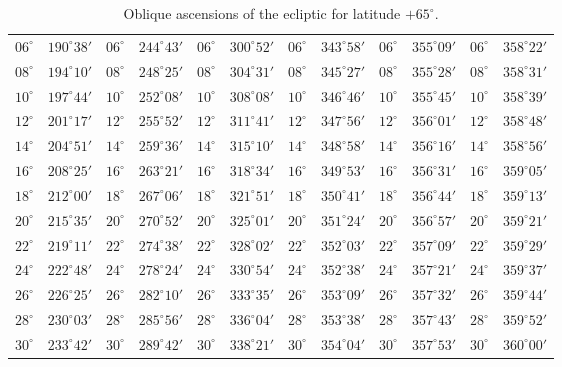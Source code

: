 \begin{table}[!h]
{\begin{tabular}{cc|cc|cc|cc|cc|cc}
$06^\circ$ & $190^\circ38'$ & $06^\circ$ & $244^\circ43'$ & $06^\circ$ & $300^\circ52'$ & $06^\circ$ & $343^\circ58'$ &  $06^\circ$ & $355^\circ09'$ & $06^\circ$ & $358^\circ22'$\\
$08^\circ$ & $194^\circ10'$ & $08^\circ$ & $248^\circ25'$ & $08^\circ$ & $304^\circ31'$ & $08^\circ$ & $345^\circ27'$ &  $08^\circ$ & $355^\circ28'$ & $08^\circ$ & $358^\circ31'$\\
$10^\circ$ & $197^\circ44'$ & $10^\circ$ & $252^\circ08'$ & $10^\circ$ & $308^\circ08'$ & $10^\circ$ & $346^\circ46'$ &  $10^\circ$ & $355^\circ45'$ & $10^\circ$ & $358^\circ39'$\\
$12^\circ$ & $201^\circ17'$ & $12^\circ$ & $255^\circ52'$ & $12^\circ$ & $311^\circ41'$ & $12^\circ$ & $347^\circ56'$ &  $12^\circ$ & $356^\circ01'$ & $12^\circ$ & $358^\circ48'$\\
$14^\circ$ & $204^\circ51'$ & $14^\circ$ & $259^\circ36'$ & $14^\circ$ & $315^\circ10'$ & $14^\circ$ & $348^\circ58'$ &  $14^\circ$ & $356^\circ16'$ & $14^\circ$ & $358^\circ56'$\\
$16^\circ$ & $208^\circ25'$ & $16^\circ$ & $263^\circ21'$ & $16^\circ$ & $318^\circ34'$ & $16^\circ$ & $349^\circ53'$ &  $16^\circ$ & $356^\circ31'$ & $16^\circ$ & $359^\circ05'$\\
$18^\circ$ & $212^\circ00'$ & $18^\circ$ & $267^\circ06'$ & $18^\circ$ & $321^\circ51'$ & $18^\circ$ & $350^\circ41'$ &  $18^\circ$ & $356^\circ44'$ & $18^\circ$ & $359^\circ13'$\\
$20^\circ$ & $215^\circ35'$ & $20^\circ$ & $270^\circ52'$ & $20^\circ$ & $325^\circ01'$ & $20^\circ$ & $351^\circ24'$ &  $20^\circ$ & $356^\circ57'$ & $20^\circ$ & $359^\circ21'$\\
$22^\circ$ & $219^\circ11'$ & $22^\circ$ & $274^\circ38'$ & $22^\circ$ & $328^\circ02'$ & $22^\circ$ & $352^\circ03'$ &  $22^\circ$ & $357^\circ09'$ & $22^\circ$ & $359^\circ29'$\\
$24^\circ$ & $222^\circ48'$ & $24^\circ$ & $278^\circ24'$ & $24^\circ$ & $330^\circ54'$ & $24^\circ$ & $352^\circ38'$ &  $24^\circ$ & $357^\circ21'$ & $24^\circ$ & $359^\circ37'$\\
$26^\circ$ & $226^\circ25'$ & $26^\circ$ & $282^\circ10'$ & $26^\circ$ & $333^\circ35'$ & $26^\circ$ & $353^\circ09'$ &  $26^\circ$ & $357^\circ32'$ & $26^\circ$ & $359^\circ44'$\\
$28^\circ$ & $230^\circ03'$ & $28^\circ$ & $285^\circ56'$ & $28^\circ$ & $336^\circ04'$ & $28^\circ$ & $353^\circ38'$ &  $28^\circ$ & $357^\circ43'$ & $28^\circ$ & $359^\circ52'$\\
$30^\circ$ & $233^\circ42'$ & $30^\circ$ & $289^\circ42'$ & $30^\circ$ & $338^\circ21'$ & $30^\circ$ & $354^\circ04'$ &  $30^\circ$ & $357^\circ53'$ & $30^\circ$ & $360^\circ00'$\\
\end{tabular}}
\caption{Oblique ascensions of the ecliptic  for latitude $+65^\circ$.}
\end{table}

